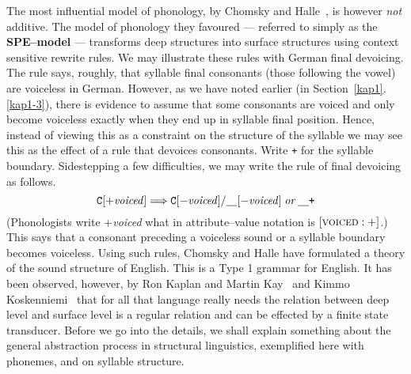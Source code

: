 The most influential model of phonology, by Chomsky and 
Halle~, is however {\it not\/} 
additive. The model of phonology they favoured --- referred to simply 
as the \textbf{SPE--model} --- transforms deep structures into surface 
structures using context sensitive rewrite rules. We may illustrate 
these rules with German final 
devoicing. The rule says, roughly, that syllable final consonants 
(those following the vowel) are voiceless in German. However, as we 
have noted earlier (in Section~\ref{kap1}.\ref{kap1-3}), there is evidence to 
assume that some consonants are voiced and only become voiceless 
exactly when they end up in syllable final position. 
Hence, instead of viewing this as a constraint on the structure 
of the syllable we may see this as the effect of a rule that 
devoices consonants. Write {\tt +} for the syllable boundary. 
Sidestepping a few difficulties, we may write the rule of 
final devoicing as follows.
\begin{equation}
\mbox{\tt C}[+ \mbox{\it voiced\/}]
\Longrightarrow \mbox{\tt C}[- \mbox{\it voiced\/}] /
\underline{\quad}[-\mbox{\it voiced\/}]\; \mbox{\it or}
\; \underline{\quad}\mbox{\tt +} 
\end{equation}
(Phonologists write +{\it voiced} what in attribute--value notation 
is $[\mbox{\sc voiced} : +]$.) This says that a consonant preceding 
a voiceless sound or a syllable boundary becomes voiceless. Using 
such rules, Chomsky 
and Halle have formulated a theory of the sound structure of English. 
This is a Type 1 grammar for English. It has 
been observed, however, by Ron Kaplan and Martin 
Kay~ 
and Kimmo Koskenniemi~ that 
for all that language really needs the relation between deep level 
and surface level is a regular relation and can be effected by a 
finite state transducer. Before we go into the details, we shall 
explain something about the general abstraction process in structural 
linguistics, exemplified here with phonemes, and on syllable structure.

